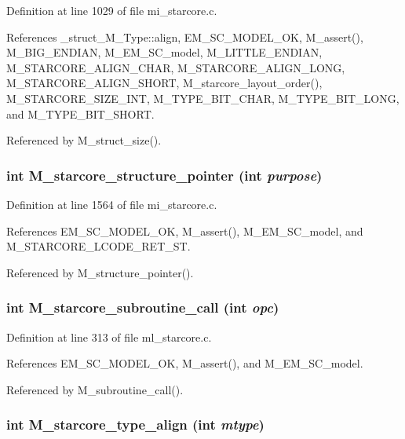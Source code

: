 Definition at line 1029 of file mi\_\-starcore.c.

References \_\-struct\_\-M\_\-Type::align, EM\_\-SC\_\-MODEL\_\-OK, M\_\-assert(), M\_\-BIG\_\-ENDIAN, M\_\-EM\_\-SC\_\-model, M\_\-LITTLE\_\-ENDIAN, M\_\-STARCORE\_\-ALIGN\_\-CHAR, M\_\-STARCORE\_\-ALIGN\_\-LONG, M\_\-STARCORE\_\-ALIGN\_\-SHORT, M\_\-starcore\_\-layout\_\-order(), M\_\-STARCORE\_\-SIZE\_\-INT, M\_\-TYPE\_\-BIT\_\-CHAR, M\_\-TYPE\_\-BIT\_\-LONG, and M\_\-TYPE\_\-BIT\_\-SHORT.

Referenced by M\_\-struct\_\-size().
\subsubsection{\setlength{\rightskip}{0pt plus 5cm}int M\_\-starcore\_\-structure\_\-pointer (int {\em purpose})}\label{m__starcore_8h_d82dda30fdcf425e963cd9acfb4a9788}




Definition at line 1564 of file mi\_\-starcore.c.

References EM\_\-SC\_\-MODEL\_\-OK, M\_\-assert(), M\_\-EM\_\-SC\_\-model, and M\_\-STARCORE\_\-LCODE\_\-RET\_\-ST.

Referenced by M\_\-structure\_\-pointer().
\subsubsection{\setlength{\rightskip}{0pt plus 5cm}int M\_\-starcore\_\-subroutine\_\-call (int {\em opc})}\label{m__starcore_8h_1e383deabdc6795fc7280a2c82df5222}




Definition at line 313 of file ml\_\-starcore.c.

References EM\_\-SC\_\-MODEL\_\-OK, M\_\-assert(), and M\_\-EM\_\-SC\_\-model.

Referenced by M\_\-subroutine\_\-call().
\subsubsection{\setlength{\rightskip}{0pt plus 5cm}int M\_\-starcore\_\-type\_\-align (int {\em mtype})}\label{m__starcore_8h_6351e61a05137c1796e48cbd19054e42}




